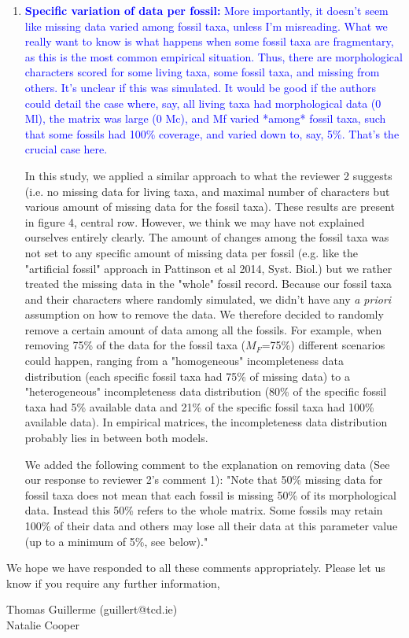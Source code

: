 \documentclass[12pt,letterpaper]{article}
\begin{document}
\begin{enumerate}
\item{\textcolor{blue}{\textbf{Specific variation of data per fossil:} More importantly, it doesn't seem like missing data varied among fossil taxa, unless I'm misreading. What we really want to know is what happens when some fossil taxa are fragmentary, as this is the most common empirical situation. Thus, there are morphological characters scored for some living taxa, some fossil taxa, and missing from others. It's unclear if this was simulated. It would be good if the authors could detail the case where, say, all living taxa had morphological data (0 Ml), the matrix was large (0 Mc), and Mf varied *among* fossil taxa, such that some fossils had 100\% coverage, and varied down to, say, 5\%. That's the crucial case here.}}

In this study, we applied a similar approach to what the reviewer 2 suggests (i.e. no missing data for living taxa, and maximal number of characters but various amount of missing data for the fossil taxa). 
These results are present in figure 4, central row.
However, we think we may have not explained ourselves entirely clearly. The amount of changes among the fossil taxa was not set to any specific amount of missing data per fossil (e.g. like the "artificial fossil" approach in Pattinson et al 2014, Syst. Biol.) but we rather treated the missing data in the "whole" fossil record.
Because our fossil taxa and their characters where randomly simulated, we didn't have any \textit{a priori} assumption on how to remove the data.
We therefore decided to randomly remove a certain amount of data among all the fossils.
For example, when removing 75\% of the data for the fossil taxa ($M_F$=75\%) different scenarios could happen, ranging from a "homogeneous" incompleteness data distribution (each specific fossil taxa had 75\% of missing data) to a "heterogeneous" incompleteness data distribution  (80\% of the specific fossil taxa had 5\% available data and 21\% of the specific fossil taxa had 100\% available data).
In empirical matrices, the incompleteness data distribution probably lies in between both models.

We added the following comment to the explanation on removing data (See our response to reviewer 2's comment 1):
"Note that 50\% missing data for fossil taxa does not mean that each fossil is missing 50\% of its morphological data.
Instead this 50\% refers to the whole matrix.
Some fossils may retain 100\% of their data and others may lose all their data at this parameter value (up to a minimum of 5\%, see below)."

\end{enumerate}

We hope we have responded to all these comments appropriately. Please let us know if you require any further information,\\
\bigskip

Thomas Guillerme (guillert@tcd.ie)\\
Natalie Cooper
\end{document}

